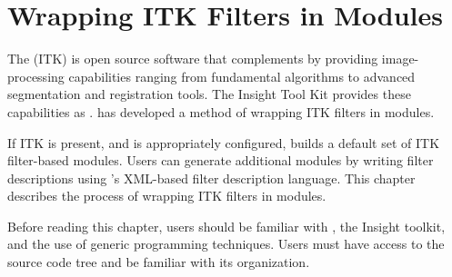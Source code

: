 %
% 
% 
% 
% 
% 
%



\chapter{Wrapping  ITK Filters in \sr{} Modules}
\label{ch:itk_mods}

The  (ITK)
is open source software that complements \sr{} by providing
image-processing capabilities ranging from fundamental algorithms to
advanced segmentation and registration tools.  The Insight Tool Kit
provides these capabilities as .  \sci{} has developed a
method of wrapping ITK filters in \sr{} modules.

If ITK is present, and \sr{} is appropriately configured, \sr{} 
builds a default set of ITK filter-based modules.  Users can generate 
additional modules by writing filter descriptions using \sr{}'s
XML-based filter description language. This chapter describes
the process of wrapping ITK filters in \sr{} modules.

Before reading this chapter, users should be familiar with \sr{}, the
Insight toolkit, and the use of generic programming techniques.  Users
must have access to the \sr{} source code tree and be familiar with
its organization.


